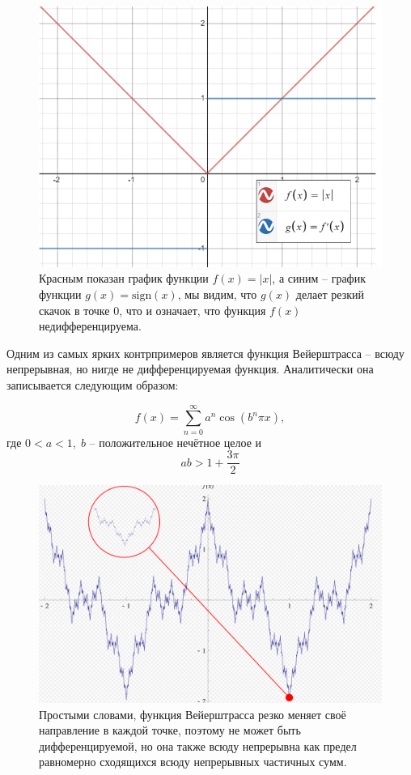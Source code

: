 \begin{figure}[h!]
    \centering
    \includegraphics[scale = 0.7]{images/abs(x)+sign(x).jpg}
     \caption{Красным показан график функции $f(x) = |x|$, а синим -- график функции $g(x) = \mathrm{sign}(x)$, мы видим, что $g(x)$ делает резкий скачок в точке $0$, что и означает, что функция $f(x)$ недифференцируема.}
\end{figure}


\begin{example}
Одним из самых ярких контрпримеров является функция Вейерштрасса -- всюду непрерывная, но нигде не дифференцируемая функция. 
Аналитически она записывается следующим образом:

\[
f(x) = \sum_{n=0}^{\infty} {a^n \cos(b^n \pi x)},
\]
где $0 < a < 1, \; b$ -- положительное нечётное целое и
\[
ab > 1 + \frac{3 \pi}{2}
\]


\begin{figure}[h!]
    \centering
    \includegraphics[width=1\linewidth]{images/WeierstrassFunction.jpeg}
    \caption{Простыми словами, функция Вейерштрасса резко меняет своё направление в каждой точке, поэтому не может быть дифференцируемой, но она также всюду непрерывна как предел равномерно сходящихся всюду непрерывных частичных сумм.    }
\end{figure}
\end{example}

